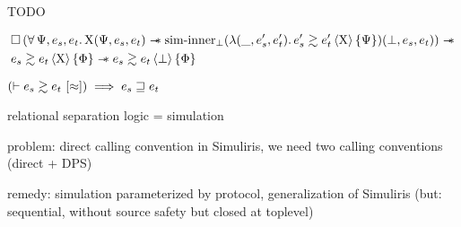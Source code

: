 


TODO

\clearpage

\begin{theorem}
    \begin{align*}
            &
            \iPersistent \left(
                \forall \Psi, e_s, e_t \ldotp
                \Chi (\Psi, e_s, e_t) \iSepImp
                \mathrm{sim \mathhyphen inner}_\bot (\lambdaAbs (\_, e_s', e_t') \ldotp \iSim[\Chi]{\Psi}{e_s'}{e_t'}) (\bot, e_s, e_t)
            \right) \iSepImp
        \\
            &
            \iSim[\Chi]{\Phi}{e_s}{e_t} \iSepImp
            \iSim[\bot]{\Phi}{e_s}{e_t}
    \end{align*}
\end{theorem}

\begin{theorem}[Adequacy]
    $
        \left( \vdash \iSimv{\iSimilar}{e_s}{e_t} \right) \implies
        e_s \refined e_t
    $
\end{theorem}

relational separation logic = simulation

problem: direct calling convention in Simuliris, we need two calling conventions (direct + DPS)

remedy: simulation parameterized by protocol, generalization of Simuliris (but: sequential, without source safety but closed at toplevel)



%
%
%
%

